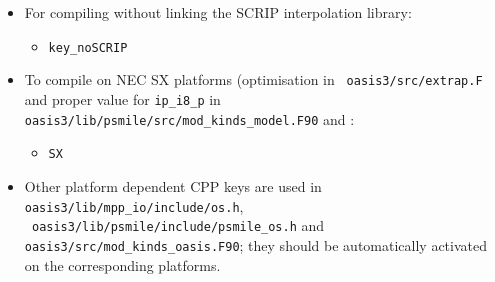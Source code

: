\begin{itemize}
%
%
%
%
%
\item For compiling without linking the SCRIP interpolation library:
  \begin{itemize}
  \item {\tt key\_noSCRIP}
  \end{itemize}

\item To compile on NEC SX platforms (optimisation in {\tt
    oasis3/src/extrap.F} and proper value for {\tt ip\_i8\_p} in {\tt
    oasis3/lib/psmile/src/mod\_kinds\_model.F90} and :
  \begin{itemize}
  \item {\tt SX}
  \end{itemize}

\item Other platform dependent CPP keys are used in {\tt
    oasis3/lib/mpp\_io/include/os.h},\\ {\tt
    oasis3/lib/psmile/include/psmile\_os.h} and {\tt
    oasis3/src/mod\_kinds\_oasis.F90}; they should be automatically
  activated on the corresponding platforms.


\end{itemize}


